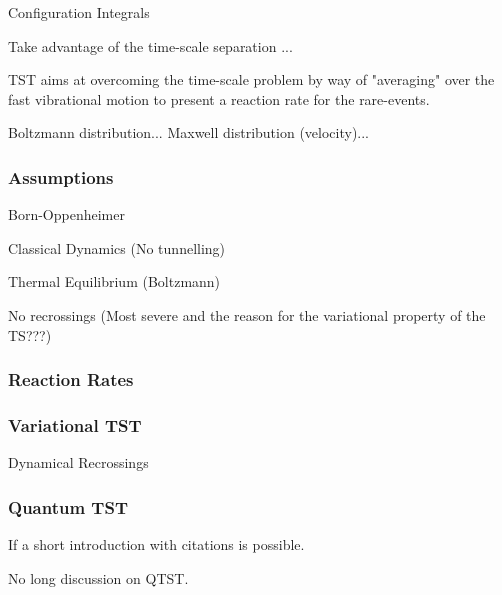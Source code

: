 \bit
\item Configuration Integrals
\eit

Take advantage of the time-scale separation ...

TST aims at overcoming the time-scale problem by way of "averaging" over the fast vibrational motion to present a reaction rate for the rare-events.

Boltzmann distribution...
Maxwell distribution (velocity)...

\incomplete

\subsubsection{Assumptions}
\bit
\item Born-Oppenheimer
\item Classical Dynamics (No tunnelling)
\item Thermal Equilibrium (Boltzmann)
\item No recrossings (Most severe and the reason for the variational property of the TS???)
\eit
\placeholder

\subsubsection{Reaction Rates}
\placeholder

\subsubsection{Variational TST}
\bit
\item Dynamical Recrossings
\eit

\subsubsection{Quantum TST}
\bit
\item If a short introduction with citations is possible.
\item No long discussion on QTST.
\eit

%
